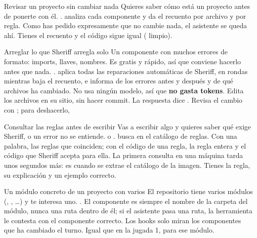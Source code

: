 \documentclass[11pt,a4paper]{article}
\begin{document}
\begin{play}{Revisar un proyecto sin cambiar nada}
\when Quieres saber cómo está un proyecto antes de ponerte con él.
\asks {}.
\happens {} analiza cada componente y da el recuento por
archivo y por regla. Como has pedido expresamente que no cambie nada, el
asistente se queda ahí.
\done Tienes el recuento y el código sigue igual ( limpio).
\end{play}

\begin{play}{Arreglar lo que Sheriff arregla solo}
\when Un componente con muchos errores de formato: imports, llaves, nombres.
Es gratis y rápido, así que conviene hacerlo antes que nada.
\asks {}.
\happens {} aplica todas las reparaciones automáticas de
Sheriff, en rondas mientras baja el recuento, e informa de los errores antes y
después y de qué archivos ha cambiado. No usa ningún modelo, así que
\textbf{no gasta tokens}. Edita los archivos en su sitio, sin hacer commit.
\done La respuesta dice . Revisa el cambio
con ; para deshacerlo, 
\end{play}

\begin{play}{Consultar las reglas antes de escribir}
\when Vas a escribir algo y quieres saber qué exige Sheriff, o un error no se
entiende.
\asks {} o .
\happens {} busca en el catálogo de reglas. Con una
palabra, las reglas que coinciden; con el código de una regla, la regla entera y
el código que Sheriff acepta para ella. La primera consulta en una máquina
tarda unos segundos más: es cuando se extrae el catálogo de la imagen.
\done Tienes la regla, su explicación y un ejemplo correcto.
\end{play}

\begin{play}{Un módulo concreto de un proyecto con varios}
\when El repositorio tiene varios módulos (, ,
\ldots) y te interesa uno.
\asks {}.
\happens El componente es siempre el nombre de la carpeta del módulo, nunca una
ruta dentro de él; si el asistente pasa una ruta, la herramienta le contesta con
el componente correcto. Los hooks solo miran los componentes que ha cambiado el
turno.
\done Igual que en la jugada 1, para ese módulo.
\end{play}
\end{document}
